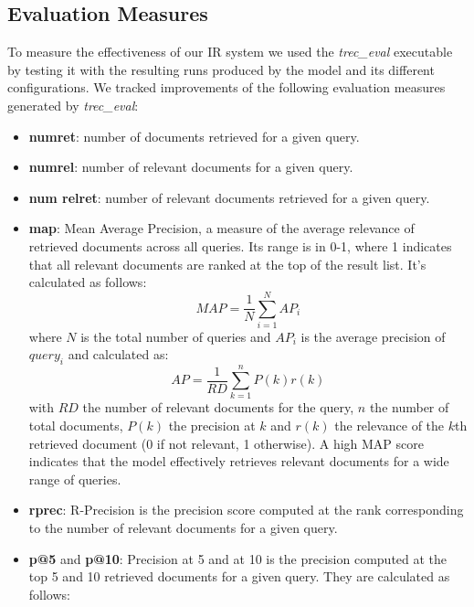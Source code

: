\subsection{Evaluation Measures}
To measure the effectiveness of our \ac{IR} system we used the \textit{trec\_eval} executable by testing it with the resulting runs produced by the model and its different configurations.
\newline
We tracked improvements of the following evaluation measures generated by \textit{trec\_eval}:
\begin{itemize}
	\item \textbf{num\textunderscore ret}: number of documents retrieved for a given query.
	\item \textbf{num\textunderscore rel}: number of relevant documents for a given query.
	\item \textbf{num \textunderscore rel\textunderscore ret}: number of relevant documents retrieved for a given query.
    \item \textbf{map}: Mean Average Precision, a measure of the average relevance of retrieved documents across all queries. Its range is in 0-1, where 1 indicates that all relevant documents are ranked at the top of the result list.
    \newline
    It's calculated as follows:
    \begin{equation*}
        MAP = \frac{1}{N} \sum_{i=1}^{N}AP_i
    \end{equation*}
    where $N$ is the total number of queries and $AP_i$ is the average precision of $query_i$ and calculated as:
    \begin{equation*}
        AP = \frac{1}{RD} \sum_{k=1}^{n}P(k)r(k)
    \end{equation*}
    with $RD$ the number of relevant documents for the query, $n$ the number of total documents, $P(k)$ the precision at $k$ and $r(k)$ the relevance of the $k$th retrieved document (0 if not relevant, 1 otherwise).
    \newline
    A high \ac{MAP} score indicates that the model effectively retrieves relevant documents for a wide range of queries.
    \item \textbf{rprec}: R-Precision is the precision score computed at the rank corresponding to the number of relevant documents for a given query.
    \item \textbf{p@5} and \textbf{p@10}: Precision at 5 and at 10 is the precision computed at the top 5 and 10 retrieved documents for a given query.
    They are calculated as follows:

\end{itemize}
